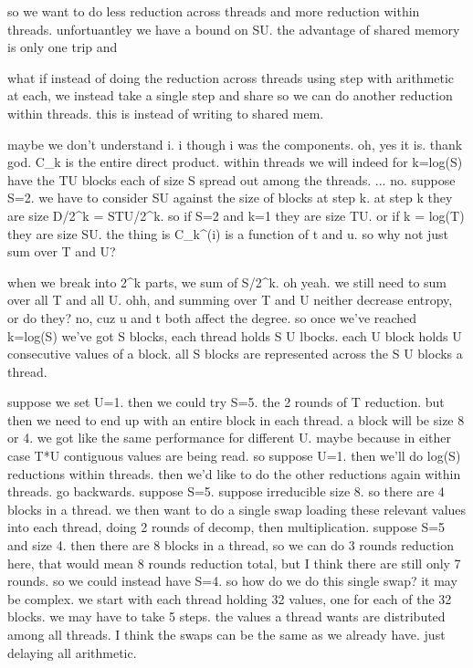 so we want to do less reduction across threads and more reduction within threads. 
unfortuantley we have a bound on SU. the advantage of shared memory is only one trip and 

what if instead of doing the reduction across threads using step with arithmetic at each, we instead take a single step and share so we can do another reduction within threads. this is instead of writing to shared mem. 

maybe we don't understand i.
i though i was the components. oh, yes it is. thank god. C_k is the entire direct product. 
within threads we will indeed for k=log(S) have the TU blocks each of size S spread out among the threads. ... no. suppose S=2. we have to consider SU against the size of blocks at step k. at step k they are size D/2^k = STU/2^k. so if S=2 and k=1 they are size TU. or if k = log(T) they are size SU.
the thing is C_k^(i) is a function of t and u. so why not just sum over T and U?

when we break into 2^k parts, we sum of S/2^k. oh yeah. we still need to sum over all T and all U. ohh, and summing over T and U neither decrease entropy, or do they? no, cuz u and t both affect the degree. 
so once we've reached k=log(S) we've got S blocks, each thread holds S U lbocks. each U block holds U consecutive values of a block. all S blocks are represented across the S U blocks a thread.

suppose we set U=1. then we could try S=5. the 2 rounds of T reduction. but then 
we need to end up with an entire block in each thread. a block will be size 8 or 4. 
we got like the same performance for different U. maybe because in either case T*U contiguous values are being read. so suppose U=1.
then we'll do log(S) reductions within threads. then we'd like to do the other reductions again within threads. 
go backwards. suppose S=5. suppose irreducible size 8. so there are 4 blocks in a thread. we then want to do a single swap loading these relevant values into each thread, doing 2 rounds of decomp, then multiplication. 
suppose S=5 and size 4. then there are 8 blocks in a thread, so we can do 3 rounds reduction here, that would mean 8 rounds reduction total, but I think there are still only 7 rounds. so we could instead have S=4. 
so how do we do this single swap? it may be complex. we start with each thread holding 32 values, one for each of the 32 blocks. we may have to take 5 steps. the values a thread wants are distributed among all threads. I think the swaps can be the same as we already have. just delaying all arithmetic.


